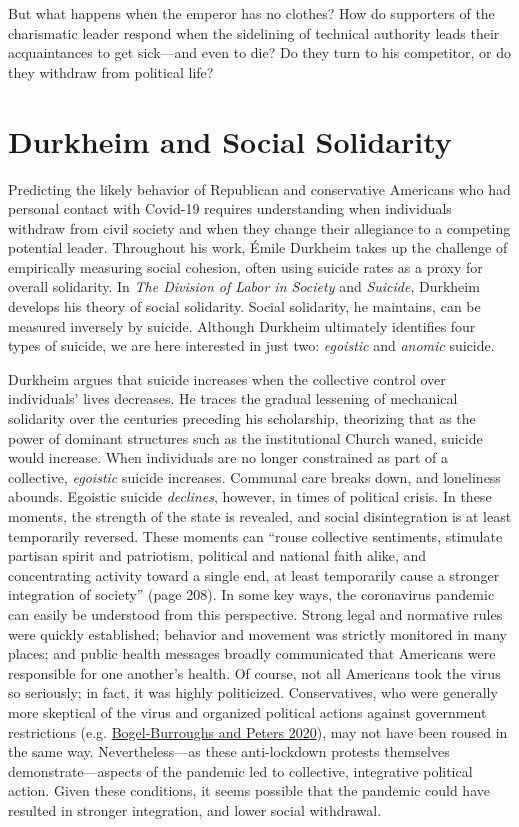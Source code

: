\documentclass[
  12pt,
]{article}
\begin{document}
But what happens when the emperor has no clothes? How do supporters of the charismatic leader respond when the sidelining of technical authority leads their acquaintances to get sick---and even to die? Do they turn to his competitor, or do they withdraw from political life?

\hypertarget{durkheim-and-social-solidarity}{%
\section*{Durkheim and Social Solidarity}\label{durkheim-and-social-solidarity}}

Predicting the likely behavior of Republican and conservative Americans who had personal contact with Covid-19 requires understanding when individuals withdraw from civil society and when they change their allegiance to a competing potential leader. Throughout his work, Émile Durkheim takes up the challenge of empirically measuring social cohesion, often using suicide rates as a proxy for overall solidarity. In \emph{The Division of Labor in Society} and \emph{Suicide}, Durkheim develops his theory of social solidarity. Social solidarity, he maintains, can be measured inversely by suicide. Although Durkheim ultimately identifies four types of suicide, we are here interested in just two: \emph{egoistic} and \emph{anomic} suicide.

Durkheim argues that suicide increases when the collective control over individuals' lives decreases. He traces the gradual lessening of mechanical solidarity over the centuries preceding his scholarship, theorizing that as the power of dominant structures such as the institutional Church waned, suicide would increase. When individuals are no longer constrained as part of a collective, \emph{egoistic} suicide increases. Communal care breaks down, and loneliness abounds. Egoistic suicide \emph{declines}, however, in times of political crisis. In these moments, the strength of the state is revealed, and social disintegration is at least temporarily reversed. These moments can ``rouse collective sentiments, stimulate partisan spirit and patriotism, political and national faith alike, and concentrating activity toward a single end, at least temporarily cause a stronger integration of society'' (page 208). In some key ways, the coronavirus pandemic can easily be understood from this perspective. Strong legal and normative rules were quickly established; behavior and movement was strictly monitored in many places; and public health messages broadly communicated that Americans were responsible for one another's health. Of course, not all Americans took the virus so seriously; in fact, it was highly politicized. Conservatives, who were generally more skeptical of the virus and organized political actions against government restrictions (e.g. \protect\hyperlink{ref-Bogel-Burroughs2020}{Bogel-Burroughs and Peters 2020}), may not have been roused in the same way. Nevertheless---as these anti-lockdown protests themselves demonstrate---aspects of the pandemic led to collective, integrative political action. Given these conditions, it seems possible that the pandemic could have resulted in stronger integration, and lower social withdrawal.
\end{document}
